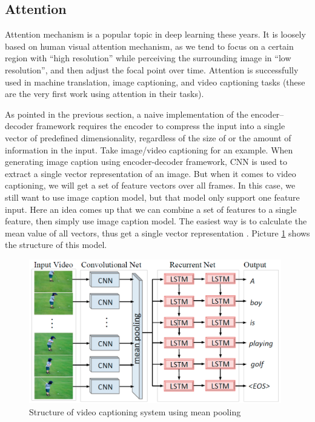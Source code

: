 \subsection{Attention}
Attention mechanism is a popular topic in deep learning these years. It is loosely based on human visual attention mechanism, as we tend to focus on a certain region with “high resolution” while perceiving the surrounding image in “low resolution”, and then adjust the focal point over time. Attention is successfully used in machine translation\cite{bahdanau2014neural}, image captioning\cite{xu2015show}, and video captioning\cite{venugopalan2014translating} tasks (these are the very first work using attention in their tasks).

As pointed in the previous section, a naive implementation of the encoder–decoder framework requires the encoder to compress the input into a single vector of predefined dimensionality, regardless of the size of or the amount of information in the input. Take image/video captioning for an example. When generating image caption using encoder-decoder framework, CNN is used to extract a single vector representation of an image. But when it comes to video captioning, we will get a set of feature vectors over all frames. In this case, we still want to use image caption model, but that model only support one feature input. Here an idea comes up that we can combine a set of features to a single feature, then simply use image caption model. The easiest way is to calculate the mean value of all vectors, thus get a single vector representation \cite{venugopalan2014translating}. Picture \ref{fig:mp} shows the structure of this model.

\begin{figure}
\centering
\includegraphics[width=11cm]{resources/mp.png}
\caption{Structure of video captioning system using mean pooling \cite{venugopalan2014translating}}
\label{fig:mp}
\end{figure}


